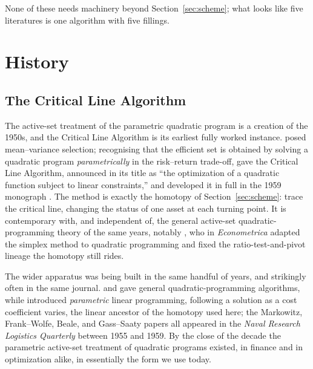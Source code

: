 \documentclass[sts]{imsart}
\theoremstyle{plain}
\theoremstyle{definition}
\begin{document}
None of these needs machinery beyond Section~\ref{sec:scheme}; what looks like five
literatures is one algorithm with five fillings.

\section{History}
\label{sec:history}

\subsection{The Critical Line Algorithm}
\label{sec:cla-history}

The active-set treatment of the parametric quadratic program is a creation of the
1950s, and the Critical Line Algorithm is its earliest fully worked instance.
\citet{markowitz1952} posed mean--variance selection; recognising that the efficient
set is obtained by solving a quadratic program \emph{parametrically} in the
risk--return trade-off, \citet{markowitz1956} gave the Critical Line Algorithm,
announced in its title as ``the optimization of a quadratic function subject to linear
constraints,'' and developed it in full in the 1959 monograph \citep{markowitz1959}.
The method is exactly the homotopy of Section~\ref{sec:scheme}: trace the critical
line, changing the status of one asset at each turning point. It is contemporary with,
and independent of, the general active-set quadratic-programming theory of the same
years, notably \citet{wolfe1959}, who in \emph{Econometrica} adapted the simplex
method to quadratic programming and fixed the ratio-test-and-pivot lineage the homotopy
still rides.

The wider apparatus was being built in the same handful of years, and strikingly often
in the same journal. \citet{frankwolfe1956} and \citet{beale1959} gave general
quadratic-programming algorithms, while \citet{gasssaaty1955} introduced
\emph{parametric} linear programming, following a solution as a cost coefficient
varies, the linear ancestor of the homotopy used here; the Markowitz, Frank--Wolfe,
Beale, and Gass--Saaty papers all appeared in the \emph{Naval Research Logistics
Quarterly} between 1955 and 1959. By the close of the decade the parametric active-set
treatment of quadratic programs existed, in finance and in optimization alike, in
essentially the form we use today.
\end{document}
